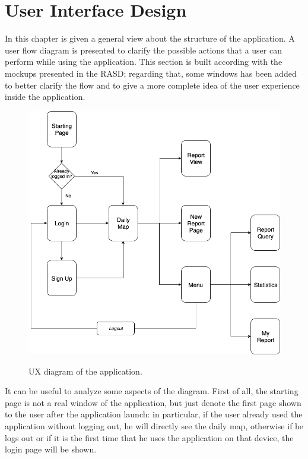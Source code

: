 \documentclass[../RASD.tex]{subfiles}
\begin{document}
    \chapter{User Interface Design}\label{ch:user-interface-design}
    In this chapter is given a general view about the structure of the application.
    A user flow diagram is presented to clarify the possible actions that a user can perform while using the application.
    This section is built according with the mockups presented in the RASD; regarding that, some windows has been added to better clarify
    the flow and to give a more complete idea of the user experience inside the application.
    \begin{figure}[H]
        \centering
        \includegraphics[scale = 1.5]{assets/ux.png}\\
        \caption[\textit{UX} Diagram]{UX diagram of the application.}
    \end{figure}
    It can be useful to analyze some aspects of the diagram.
    First of all, the starting page is not a real window of the application, but just denote the first page shown to the user after the application launch:
    in particular, if the user already used the application without logging out, he will directly see the daily map, otherwise if he logs out or if it is the first time
    that he uses the application on that device, the login page will be shown.
\end{document}
